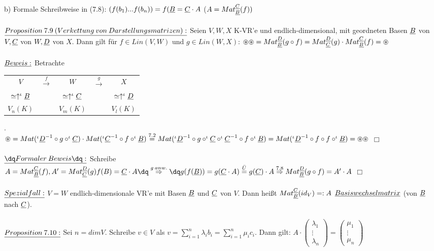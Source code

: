 \documentclass[fleqn, a4paper, 11pt]{article}
\begin{document}
b) Formale Schreibweise in (7.8): $(f(b_1)...f(b_n))=f(\uline{B}=\uline{C}\cdot A$ ($A=Mat_{\uline{B}}^{\uline{C}}(f))$\\
\\
$\uline{Proposition\:7.9\:(Verkettung\:von\:Darstellungsmatrizen):}$ Seien $V,W,X$ K-VR'e und endlich-dimensional, mit geordneten Basen $\uline{B}$ von $V,\uline{C}$ von $W,\uline{D}$ von $X$. Dann gilt f\"ur $f\in Lin(V,W)$ und $g\in Lin(W,X)$: $\circledast\circledast=Mat_{\uline{B}}^{\uline{D}}(g\circ f)=Mat_{\uline{C}}^{\uline{D}}(g)\cdot Mat_{\uline{B}}^{\uline{C}}(f)=\circledast$\\
\\
$\uline{Beweis:}$ Betrachte \begin{tabular}{ccccc}
	$V$ & $\stackrel{f}{\rightarrow}$ & $W$ & $\stackrel{g}{\rightarrow}$ & $X$ \\
	$\simeq\uparrow ^\iota\uline{B}$ & & $\simeq\uparrow ^\iota\uline{C}$ & & $\simeq\uparrow ^\iota\uline{D}$\\
	$V_n(K)$ & & $V_m(K)$ & & $V_l(K)$
\end{tabular}.\\
$\circledast=Mat(^\iota\uline{D}^{-1}\circ g\circ ^\iota\uline{C})\cdot Mat(^\iota\uline{C}^{-1}\circ f\circ ^\iota\uline{B})\stackrel{7.2}{=}Mat(^\iota\uline{D}^{-1}\circ g\circ ^\iota\uline{C}\circ^\iota\uline{C}^{-1}\circ f\circ^\iota\uline{B})=Mat(^\iota\uline{D}^{-1}\circ f\circ f\circ ^\iota\uline{B})=\circledast\circledast$ \hfill $\Box$\\
\\
$\uline{\dq Formaler\:Beweis\dq:}$ Schreibe $A=Mat_{\uline{B}}^{\uline{C}}(f),A'=Mat_{\uline{C}}^{\uline{D}}(g)\\
f(B)=\uline{C}\cdot A\dq\stackrel{g\:anw.}{\Rightarrow}\dq g(f(\uline{B}))=g(\uline{C}\cdot A)\stackrel{\ddot{U}}{=} g(\uline{C})\cdot A\stackrel{7.8}{\Rightarrow} Mat_{\uline{B}}^{\uline{D}}(g\circ f)=A'\cdot A$ \hfill $\Box$\\
\\
$\uline{Spezialfall:}$ $V=W$ endlich-dimensionale VR'e mit Basen $\uline{B}$ und $\uline{C}$ von $V$. Dann hei\ss{}t $Mat_{\uline{B}}^{\uline{C}}(id_V)=:A$ $\uline{Basiswechselmatrix}$ (von $\uline{B}$ nach $\uline{C}$).\\
\\
$\uline{Proposition\:7.10:}$ Sei $n=dim V$. Schreibe $v\in V$ als $v=\sum\limits_{i=1}^n \lambda_i b_i=\sum\limits_{i=1}^n \mu_i c_i$. Dann gilt: $A\cdot \begin{pmatrix}
	\lambda_1\\
	\vdots\\
	\lambda_n
\end{pmatrix}=\begin{pmatrix}
	\mu_1\\
	\vdots\\
	\mu_n
\end{pmatrix}$\\
\end{document}
